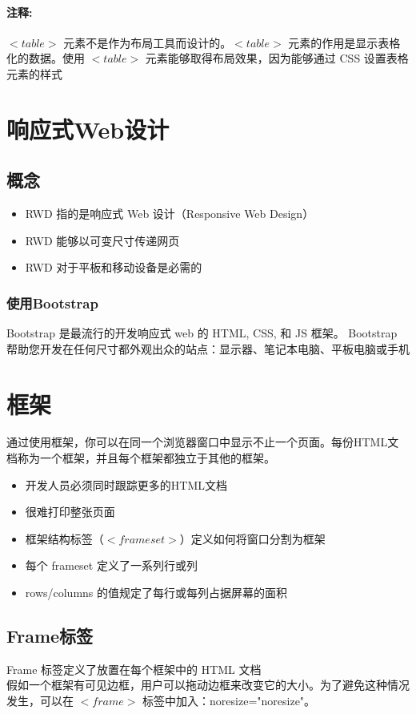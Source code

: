 \documentclass[10pt,UTF8]{ctexart}
\begin{document}
\paragraph{注释:} $<table>$ 元素不是作为布局工具而设计的。$<table>$ 元素的作用是显示表格化的数据。使用 $<table>$ 元素能够取得布局效果，因为能够通过 CSS 设置表格元素的样式

\section{响应式Web设计}
\subsection{概念}
\begin{itemize}
\item RWD 指的是响应式 Web 设计（Responsive Web Design）
\item RWD 能够以可变尺寸传递网页
\item RWD 对于平板和移动设备是必需的
\end{itemize}

\subsubsection{使用Bootstrap}
Bootstrap 是最流行的开发响应式 web 的 HTML, CSS, 和 JS 框架。
Bootstrap 帮助您开发在任何尺寸都外观出众的站点：显示器、笔记本电脑、平板电脑或手机

\section{框架}
通过使用框架，你可以在同一个浏览器窗口中显示不止一个页面。每份HTML文档称为一个框架，并且每个框架都独立于其他的框架。
\begin{itemize}
\item 开发人员必须同时跟踪更多的HTML文档
\item 很难打印整张页面
\item 框架结构标签（$<frameset>$）定义如何将窗口分割为框架
\item 每个 frameset 定义了一系列行或列
\item rows/columns 的值规定了每行或每列占据屏幕的面积
\end{itemize}
\subsection{Frame标签}
Frame 标签定义了放置在每个框架中的 HTML 文档\\
假如一个框架有可见边框，用户可以拖动边框来改变它的大小。为了避免这种情况发生，可以在 $<frame>$ 标签中加入：noresize="noresize"。
\end{document}
